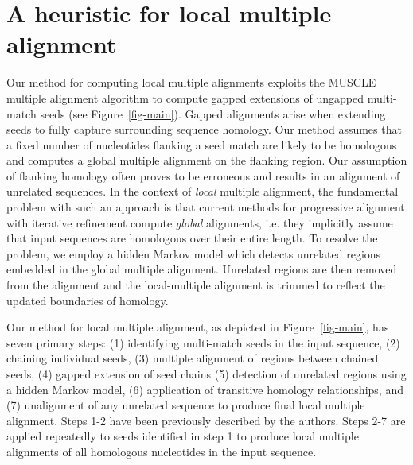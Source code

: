 \documentclass{llncs}
\begin{document}
\section{A heuristic for local multiple alignment}
Our method for computing local multiple alignments exploits the MUSCLE
multiple alignment algorithm to compute gapped extensions of ungapped
multi-match seeds (see Figure~\ref{fig-main}). Gapped alignments arise
when extending seeds to fully capture surrounding sequence
homology. Our method assumes that a fixed number of nucleotides
flanking a seed match are likely to be homologous and computes a
global multiple alignment on the flanking region.  Our assumption of
flanking homology often proves to be erroneous and results in an
alignment of unrelated sequences.  In the context of \textit{local}
multiple alignment, the fundamental problem with such an approach is
that current methods for progressive alignment with iterative
refinement compute \textit{global} alignments, i.e. they implicitly
assume that input sequences are homologous over their entire length.
To resolve the problem, we employ a hidden Markov model which detects
unrelated regions embedded in the global multiple alignment.
Unrelated regions are then removed from the alignment and the
local-multiple alignment is trimmed to reflect the updated boundaries
of homology.

Our method for local multiple alignment, as depicted in
Figure~\ref{fig-main}, has seven primary steps: (1) identifying
multi-match seeds in the input sequence, (2) chaining individual
seeds, (3) multiple alignment of regions between chained seeds, (4)
gapped extension of seed chains (5) detection of unrelated regions
using a hidden Markov model, (6) application of transitive homology
relationships, and (7) unalignment of any unrelated sequence to
produce final local multiple alignment.  Steps 1-2 have been previously
described by the authors\cite{ref-procrast}. Steps 2-7 are applied
repeatedly to seeds identified in step 1 to produce local multiple
alignments of all homologous nucleotides in the input sequence.
\end{document}
